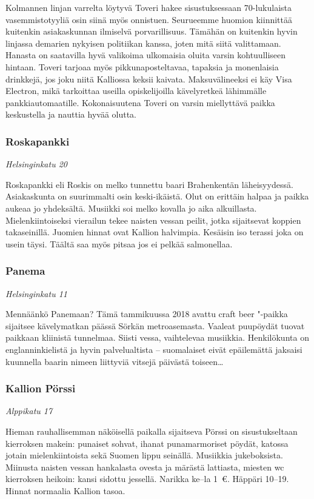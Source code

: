 \documentclass[../ala_hataile.tex]{subfiles}
\begin{document}
Kolmannen linjan varrelta löytyvä Toveri
hakee sisustuksessaan 70-lukulaista vasemmistotyyliä osin siinä myös onnistuen.
Seurueemme huomion kiinnittää kuitenkin
asiakaskunnan ilmiselvä porvarillisuus.
Tämähän on kuitenkin hyvin
linjassa demarien nykyisen politiikan kanssa,
joten mitä siitä valittamaan. Hanasta on
saatavilla hyvä valikoima ulkomaisia oluita
varsin kohtuulliseen hintaan. Toveri tarjoaa
myös pikkunaposteltavaa, tapaksia ja monenlaisia
drinkkejä, jos joku niitä Kalliossa
keksii kaivata. Maksuvälineeksi ei käy Visa
Electron, mikä tarkoittaa useilla opiskelijoilla
kävelyretkeä lähimmälle pankkiautomaatille.
Kokonaisuutena Toveri on varsin
miellyttävä paikka keskustella ja nauttia
hyvää olutta.
\subsubsection*{Roskapankki}
\textit{Helsinginkatu 20}

Roskapankki eli Roskis on melko tunnettu
baari Brahenkentän läheisyydessä.
Asiakaskunta
on suurimmalti osin keski-ikäistä.
Olut on erittäin halpaa ja paikka aukeaa
jo yhdeksältä. Musiikki soi melko kovalla
jo aika alkuillasta. Mielenkiintoiseksi
vierailun tekee naisten vessan peilit, jotka
sijaitsevat koppien takaseinillä. Juomien
hinnat ovat Kallion halvimpia. Kesäisin iso
terassi joka on usein täysi. Täältä saa myös
pitsaa jos ei pelkää salmonellaa.
\subsubsection*{Panema}
\textit{Helsinginkatu 11}

Mennäänkö Panemaan? Tämä tammikuussa 2018 avattu craft beer "-paikka sijaitsee kävelymatkan päässä Sörkän
metroasemasta. Vaaleat puupöydät tuovat paikkaan kliinistä tunnelmaa. Siisti vessa,
vaihtelevaa musiikkia. Henkilökunta on englanninkielistä ja hyvin palvelualtista -- suomalaiset eivät epäilemättä jaksaisi kuunnella baarin nimeen liittyviä vitsejä päivästä toiseen\dots
\subsubsection*{Kallion Pörssi}
\textit{Alppikatu 17}

Hieman rauhallisemman näköisellä
paikalla sijaitseva Pörssi on sisustukseltaan
kierroksen makein: punaiset sohvat,
ihanat punamarmoriset pöydät, katossa
jotain mielenkiintoista sekä Suomen lippu
seinällä. Musiikkia jukeboksista. Miinusta
naisten vessan hankalasta ovesta ja märästä
lattiasta, miesten wc kierroksen heikoin:
kansi sidottu jessellä. Narikka ke--la 1~\euro.
Häppäri 10--19. Hinnat normaalia Kallion
tasoa.
\end{document}
